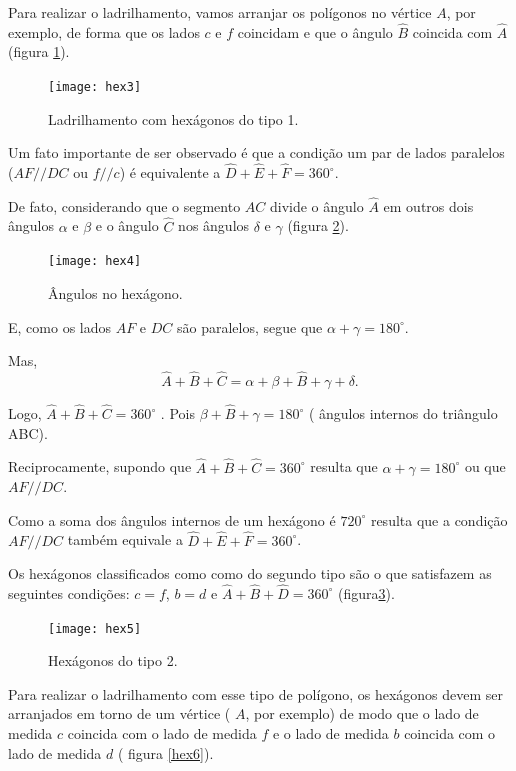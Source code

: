  
Para realizar o ladrilhamento, vamos arranjar os polígonos no vértice $A$, por exemplo, de forma que os lados $c$ e $f$ coincidam e que o ângulo $\hat{B}$ coincida com $\hat{A}$ (figura \ref{hex3}).

\begin{figure}[H]
\centering
\texttt{[image: hex3]}
\label{hex3}
\caption{Ladrilhamento com hexágonos do tipo 1.}
\end{figure}

Um fato importante de ser observado é que a condição um par de lados paralelos ($AF//DC$ ou $f//c$)  é equivalente a $\hat{D} + \hat{E} + \hat{F} = 360^{\circ}$.

De fato,  considerando que o segmento $AC$ divide o ângulo $\hat{A}$ em outros dois ângulos $\alpha$ e $\beta$ e o ângulo $\hat{C}$ nos ângulos $\delta$ e $\gamma$ (figura \ref{hex4}).


\begin{figure}[H]
\centering
\texttt{[image: hex4]}
\label{hex4}
\caption{Ângulos no hexágono.}
\end{figure}

E, como os lados $AF$ e $DC$ são paralelos, segue que $\alpha +\gamma = 180^{\circ}$.

Mas, $$\hat{A} + \hat{B} + \hat{C} = \alpha + \beta + \hat{B} + \gamma + \delta.$$

Logo, $\hat{A} + \hat{B} + \hat{C} = 360^{\circ}$ . Pois  $\beta + \hat{B} + \gamma = 180^{\circ}$ ( ângulos internos do triângulo ABC).

Reciprocamente, supondo que $\hat{A} + \hat{B} + \hat{C} = 360^{\circ}$ resulta que  $\alpha +\gamma = 180^{\circ}$ ou que $AF//DC$.

Como a soma dos ângulos internos de um hexágono é $720^{\circ}$ resulta que a condição $AF//DC$ também equivale a $\hat{D} + \hat{E} + \hat{F} = 360^{\circ}$.



Os hexágonos classificados como  como do segundo tipo são o que satisfazem as seguintes condições: $c= f$, $b=d$ e  $\hat{A} + \hat{B} + \hat{D} = 360^{\circ}$ (figura\ref{hex5}).

\begin{figure}[H]
\centering
\texttt{[image: hex5]}
\label{hex5}
\caption{Hexágonos do tipo 2.}
\end{figure}


Para realizar o ladrilhamento com esse tipo de polígono, os hexágonos devem ser arranjados em torno de um vértice ( $A$, por exemplo)  de modo que o lado de medida $c$ coincida com o lado de medida $f$ e o lado de medida $b$ coincida com o lado de medida $d$ ( figura \ref{hex6}).

